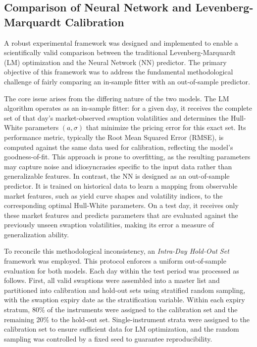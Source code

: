 {\subsection{Comparison of Neural Network and Levenberg-Marquardt Calibration}
\label{subsec:comparison_of_nn_and_lm}
A robust experimental framework was designed and implemented to enable a scientifically valid comparison between the traditional Levenberg-Marquardt (LM) optimization and the Neural Network (NN) predictor. The primary objective of this framework was to address the fundamental methodological challenge of fairly comparing an in-sample fitter with an out-of-sample predictor.

The core issue arises from the differing nature of the two models. The LM algorithm operates as an in-sample fitter: for a given day, it receives the complete set of that day's market-observed swaption volatilities and determines the Hull-White parameters $(a, \sigma)$ that minimize the pricing error for this exact set. Its performance metric, typically the Root Mean Squared Error (RMSE), is computed against the same data used for calibration, reflecting the model's goodness-of-fit. This approach is prone to overfitting, as the resulting parameters may capture noise and idiosyncrasies specific to the input data rather than generalizable features. In contrast, the NN is designed as an out-of-sample predictor. It is trained on historical data to learn a mapping from observable market features, such as yield curve shapes and volatility indices, to the corresponding optimal Hull-White parameters. On a test day, it receives only these market features and predicts parameters that are evaluated against the previously unseen swaption volatilities, making its error a measure of generalization ability.

To reconcile this methodological inconsistency, an \emph{Intra-Day Hold-Out Set} framework was employed. This protocol enforces a uniform out-of-sample evaluation for both models. Each day within the test period was processed as follows. First, all valid swaptions were assembled into a master list and partitioned into calibration and hold-out sets using stratified random sampling, with the swaption expiry date as the stratification variable. Within each expiry stratum, 80\% of the instruments were assigned to the calibration set and the remaining 20\% to the hold-out set. Single-instrument strata were assigned to the calibration set to ensure sufficient data for LM optimization, and the random sampling was controlled by a fixed seed to guarantee reproducibility.

}
